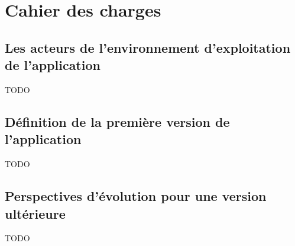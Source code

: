 \chapter{Cahier des charges}
\label{ch:specifications}







\section{Les acteurs de l'environnement d'exploitation de l'application}
\label{sec:application-operation-actors}

    TODO

\section{Définition de la première version de l'application}
\label{sec:first-version-definition}

    TODO

\section{Perspectives d'évolution pour une version ultérieure}
\label{sec:future-release-outlook}

    TODO
